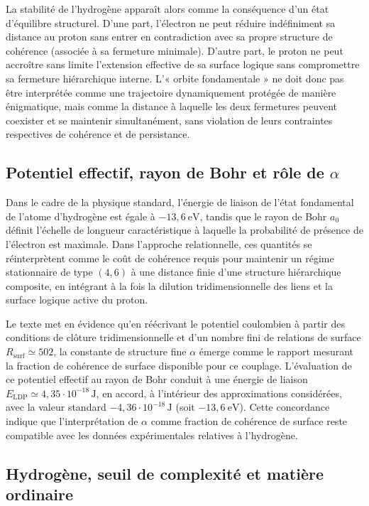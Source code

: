 \documentclass[11pt,a4paper]{article}
\begin{document}
La stabilité de l’hydrogène apparaît alors comme la conséquence d’un état d’équilibre structurel. D’une part, l’électron ne peut réduire indéfiniment sa distance au proton sans entrer en contradiction avec sa propre structure de cohérence (associée à sa fermeture minimale). D’autre part, le proton ne peut accroître sans limite l’extension effective de sa surface logique sans compromettre sa fermeture hiérarchique interne. L’« orbite fondamentale » ne doit donc pas être interprétée comme une trajectoire dynamiquement protégée de manière énigmatique, mais comme la distance à laquelle les deux fermetures peuvent coexister et se maintenir simultanément, sans violation de leurs contraintes respectives de cohérence et de persistance.

\subsection{Potentiel effectif, rayon de Bohr et rôle de \texorpdfstring{\(\alpha\)}{alpha}}

Dans le cadre de la physique standard, l’énergie de liaison de l’état fondamental de l’atome d’hydrogène est égale à \(-13{,}6\ \mathrm{eV}\), tandis que le rayon de Bohr \(a_0\) définit l’échelle de longueur caractéristique à laquelle la probabilité de présence de l’électron est maximale. Dans l’approche relationnelle, ces quantités se réinterprètent comme le coût de cohérence requis pour maintenir un régime stationnaire de type \(\left(4,6\right)\) à une distance finie d’une structure hiérarchique composite, en intégrant à la fois la dilution tridimensionnelle des liens et la surface logique active du proton.

Le texte met en évidence qu’en réécrivant le potentiel coulombien à partir des conditions de clôture tridimensionnelle et d’un nombre fini de relations de surface \(R_{\mathrm{surf}} \simeq 502\), la constante de structure fine \(\alpha\) émerge comme le rapport mesurant la fraction de cohérence de surface disponible pour ce couplage. L’évaluation de ce potentiel effectif au rayon de Bohr conduit à une énergie de liaison \(E_{\mathrm{LDP}} \simeq 4{,}35\cdot 10^{-18}\,\mathrm{J}\), en accord, à l’intérieur des approximations considérées, avec la valeur standard \(-4{,}36\cdot 10^{-18}\,\mathrm{J}\) (soit \(-13{,}6\ \mathrm{eV}\)). Cette concordance indique que l’interprétation de \(\alpha\) comme fraction de cohérence de surface reste compatible avec les données expérimentales relatives à l’hydrogène.

\subsection{Hydrogène, seuil de complexité et matière ordinaire}
\end{document}
